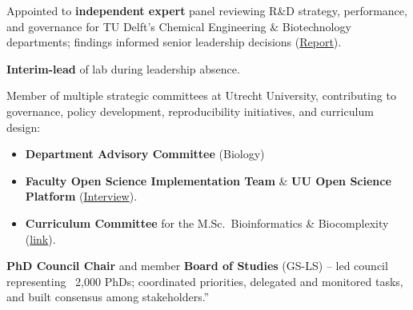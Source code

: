 \documentclass[a4paper,10pt]{article}
\begin{document}
{\begin{adjustbox}{valign=t}
\begin{minipage}[t]{0.6\textwidth}

\begin{description}
\raggedright
\item[\normalfont \textcolor{ForestGreen}{\textbf{2021 -- 2022.}}] Appointed to \textbf{independent expert} panel reviewing R\&D strategy, performance, and governance 
  for TU Delft’s Chemical Engineering \& Biotechnology departments; findings informed senior leadership decisions 
  (\href{https://filelist.tudelft.nl/TUDelft/Onderzoek/Kwaliteitsborging/Final report SEP Chemistry TU Delft 20220204.pdf}{Report}).
\item[\normalfont \textcolor{ForestGreen}{\textbf{2019.}}] \textbf{Interim-lead} of lab during leadership absence.
\item[\normalfont \textcolor{ForestGreen}{\textbf{2019 -- now.}}] Member of multiple strategic committees at Utrecht University, 
contributing to governance, policy development, reproducibility initiatives, and curriculum design:
  \begin{itemize}
    \item \textbf{Department Advisory Committee} (Biology) %
    \item \textbf{Faculty Open Science Implementation Team} \& \textbf{UU Open Science Platform} %
      (\href{https://www.uu.nl/en/news/meet-laura-dijkhuizen}{Interview}).
    \item \textbf{Curriculum Committee} for the M.Sc.\ Bioinformatics \& Biocomplexity %
    (\href{https://www.uu.nl/en/masters/bioinformatics-and-biocomplexity}{link}).
  \end{itemize}
  \item[\normalfont \textcolor{ForestGreen}{\textbf{2017 -- 2021.}}] \textbf{PhD Council Chair} 
    and member \textbf{Board of Studies} (GS-LS) 
      -- led council representing ~2,000 PhDs; coordinated priorities, delegated and monitored tasks, 
      and built consensus among stakeholders.”
\end{description}



\end{minipage}
\end{adjustbox}}
\end{document}
